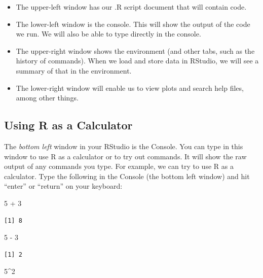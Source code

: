 \documentclass[
  letterpaper,
  DIV=11,
  numbers=noendperiod]{scrreprt}
\newenvironment{Shaded}{\begin{snugshade}}{\end{snugshade}}
\newcommand{\DecValTok}[1]{\textcolor[rgb]{0.68,0.00,0.00}{#1}}
\newcommand{\SpecialCharTok}[1]{\textcolor[rgb]{0.37,0.37,0.37}{#1}}
\providecommand{\tightlist}{%
  \setlength{\itemsep}{0pt}\setlength{\parskip}{0pt}}\usepackage{longtable,booktabs,array}
\begin{document}
\begin{itemize}
\tightlist
\item
  The upper-left window has our .R script document that will contain
  code.
\item
  The lower-left window is the console. This will show the output of the
  code we run. We will also be able to type directly in the console.
\item
  The upper-right window shows the environment (and other tabs, such as
  the history of commands). When we load and store data in RStudio, we
  will see a summary of that in the environment.
\item
  The lower-right window will enable us to view plots and search help
  files, among other things.
\end{itemize}

\hypertarget{using-r-as-a-calculator}{%
\subsection{Using R as a Calculator}\label{using-r-as-a-calculator}}

The \emph{bottom left} window in your RStudio is the Console. You can
type in this window to use R as a calculator or to try out commands. It
will show the raw output of any commands you type. For example, we can
try to use R as a calculator. Type the following in the Console (the
bottom left window) and hit ``enter'' or ``return'' on your keyboard:

\begin{Shaded}
\begin{Highlighting}[]
\DecValTok{5} \SpecialCharTok{+} \DecValTok{3}
\end{Highlighting}
\end{Shaded}

\begin{verbatim}
[1] 8
\end{verbatim}

\begin{Shaded}
\begin{Highlighting}[]
\DecValTok{5} \SpecialCharTok{{-}} \DecValTok{3}
\end{Highlighting}
\end{Shaded}

\begin{verbatim}
[1] 2
\end{verbatim}

\begin{Shaded}
\begin{Highlighting}[]
\DecValTok{5}\SpecialCharTok{\^{}}\DecValTok{2}
\end{Highlighting}
\end{Shaded}
\end{document}
